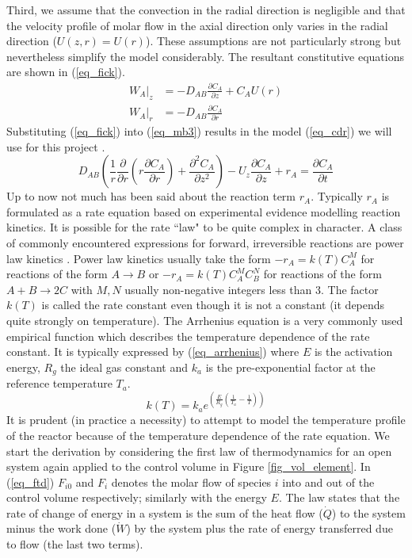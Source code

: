 \documentclass[11pt,fleqn]{article}
\theoremstyle{defstyle}
\begin{document}
Third, we assume that the convection in the radial direction is negligible and that the velocity profile of molar flow in the axial direction only varies in the radial direction ($U(z,r)=U(r)$). These assumptions are not particularly strong but nevertheless simplify the model considerably. The resultant constitutive equations are shown in (\ref{eq_fick}).  
\begin{equation}
\begin{aligned}
W_A|_z &= -D_{AB}\frac{\partial C_A}{\partial z} + C_A U(r) \\
W_A|_r &= -D_{AB}\frac{\partial C_A}{\partial r}  
\end{aligned}
\label{eq_fick}
\end{equation} 
Substituting (\ref{eq_fick}) into (\ref{eq_mb3}) results in the model (\ref{eq_cdr}) we will use for this project \cite{fogler}.
\begin{equation}
D_{AB}\left(\frac{1}{r}\frac{\partial}{\partial r}\left(r\frac{\partial C_A}{\partial r}\right) + \frac{\partial^2 C_A}{\partial z^2}\right) - U_z\frac{\partial C_A}{\partial z} + r_A = \frac{\partial C_A}{\partial t}
\label{eq_cdr}
\end{equation}
Up to now not much has been said about the reaction term $r_A$. Typically $r_A$ is formulated as a rate equation based on experimental evidence modelling reaction kinetics. It is possible for the rate ``law" to be quite complex in character. A class of commonly encountered expressions for forward, irreversible reactions are power law kinetics \cite{levenspiel}. Power law kinetics usually take the form $-r_A=k(T)C_A^M$ for reactions of the form $A \rightarrow B$ or $-r_A=k(T)C_A^MC_B^N$ for reactions of the form $A + B \rightarrow 2C$ with $M,N$ usually non-negative integers less than 3. The factor $k(T)$ is called the rate constant even though it is not a constant (it depends quite strongly on temperature). The Arrhenius equation is a very commonly used empirical function which describes the temperature dependence of the rate constant. It is typically expressed by (\ref{eq_arrhenius}) where $E$ is the activation energy, $R_g$ the ideal gas constant and $k_a$ is the pre-exponential factor at the reference temperature $T_a$. 
\begin{equation}
k(T) = k_a e^{\left(\frac{E}{R_g}\left(\frac{1}{T_a} - \frac{1}{T}\right)\right)}
\label{eq_arrhenius}
\end{equation} 
It is prudent (in practice a necessity) to attempt to model the temperature profile of the reactor because of the temperature dependence of the rate equation. We start the derivation by considering the first law of thermodynamics for an open system again applied to the control volume in Figure \ref{fig_vol_element}. In (\ref{eq_ftd}) $F_{i0}$ and $F_{i}$ denotes the molar flow of species $i$ into and out of the control volume respectively; similarly with the energy $E$. The law states that the rate of change of energy in a system is the sum of the heat flow ($\dot{Q}$) to the system minus the work done ($\dot{W}$) by the system plus the rate of energy transferred due to flow (the last two terms). 
\end{document}

